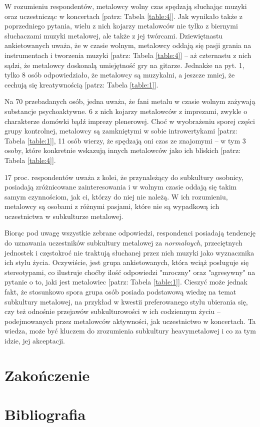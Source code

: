 \documentclass[12pt, a4paper, titlepage]{report}
\begin{document}
W rozumieniu respondentów, metalowcy wolny czas spędzają słuchając muzyki oraz uczestnicząc w koncertach [patrz: Tabela \ref{table:4}]. Jak wynikało także z poprzedniego pytania, wielu z nich kojarzy metalowców nie tylko z biernymi słuchaczami muzyki metalowej, ale także z jej twórcami. Dziewiętnastu ankietowanych uważa, że w czasie wolnym, metalowcy oddają się pasji grania na instrumentach i tworzenia muzyki [patrz: Tabela \ref{table:4}] -- aż czternastu z nich sądzi, że metalowcy doskonalą umiejętność gry na gitarze. Jednakże na pyt. 1, tylko 8 osób odpowiedziało, że metalowcy są muzykalni, a jeszcze mniej, że cechują się kreatywnością [patrz: Tabela \ref{table:1}].

Na 70 przebadanych osób, jedna uważa, że fani metalu w czasie wolnym zażywają substancje psychoaktywne. 6 z nich kojarzy metalowców z imprezami, zwykle o charakterze domówki bądź imprezy plenerowej. Choć w wyobrażeniu sporej części grupy kontrolnej, metalowcy są zamkniętymi w sobie introwertykami [patrz: Tabela \ref{table:1}], 11 osób wierzy, że spędzają oni czas ze znajomymi -- w tym 3 osoby, które konkretnie wskazują innych metalowców jako ich bliskich [patrz: Tabela \ref{table:4}].

17 proc. respondentów uważa z kolei, że przynależący do subkultury osobnicy, posiadają zróżnicowane zainteresowania i w wolnym czasie oddają się takim samym czynnościom, jak ci, którzy do niej nie należą. W ich rozumieniu, metalowcy są osobami z różnymi pasjami, które nie są wypadkową ich uczestnictwa w subkulturze metalowej.

Biorąc pod uwagę wszystkie zebrane odpowiedzi, respondenci posiadają tendencję do uznawania uczestników subkultury metalowej za \emph{normalnych}, przeciętnych jednostek i częstokroć nie traktują słuchanej przez nich muzyki jako wyznacznika ich stylu życia. Oczywiście, jest grupa ankietowanych, która wciąż posługuje się stereotypami, co ilustruje choćby ilość odpowiedzi "mroczny" oraz "agresywny" na pytanie o to, jaki jest metalowiec [patrz: Tabela \ref{table:1}]. Cieszyć może jednak fakt, że stosunkowo spora grupa osób posiada podstawową wiedzę na temat subkultury metalowej, na przykład w kwestii preferowanego stylu ubierania się, czy też odnośnie przejawów subkulturowości w ich codziennym życiu -- podejmowanych przez metalowców aktywności, jak uczestnictwo w koncertach. Ta wiedza, może być kluczem do zrozumienia subkultury heavymetalowej i co za tym idzie, jej akceptacji.

\chapter*{Zakończenie}
\chapter*{Bibliografia}
\end{document}
